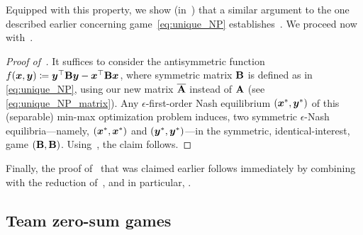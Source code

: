 Equipped with this property, we show (in~) that a similar argument to the one described earlier concerning game~\eqref{eq:unique_NP} establishes~. We proceed now with~.
\begin{proof}[Proof of~]
It suffices to consider the antisymmetric function $f({\bm{x}},{\bm{y}}) \coloneqq {\bm{y}}^{\top} \mathbf{B}{\bm{y}} - {\bm{x}}^{\top} \mathbf{B}{\bm{x}}$, where symmetric matrix $\mathbf{B}$ is defined as in \eqref{eq:unique_NP}, using our new matrix $\overline{\mathbf{A}}$ instead of $\mathbf{A}$ (see \eqref{eq:unique_NP_matrix}). Any $\epsilon$-first-order Nash equilibrium $({\bm{x}}^*, {\bm{y}}^*)$ of this (separable) min-max optimization problem induces, two symmetric $\epsilon$-Nash equilibria---namely, $({\bm{x}}^*, {\bm{x}}^*)$ and $({\bm{y}}^*, {\bm{y}}^*)$---in the symmetric, identical-interest, game $(\mathbf{B}, \mathbf{B})$. Using~, the claim follows.
\end{proof}

Finally, the proof of~ that was claimed earlier follows immediately by combining~ with the reduction of~, and in particular, .

\iffalse

\begin{corollary}\label{cor:either} Given antisymmetric, continuous, $L$-smooth functions $f,g$, the problem of finding either an approximate symmetric fixed point of GDA for $f$ or an approximate non-symmetric fixed point of GDA for $g$ is \PPAD-complete.
\end{corollary}
\begin{proof} We consider the problem $\mathcal{A}$ to be $\symgdaFixed$ and $\mathcal{B}$ $\nsymgdaFixed.$ Using the same reasoning as by~\citet{Daskalakis11:Continuous}, we conclude that the problem $\textrm{EITHER}(\mathcal{A},\mathcal{B})$ is $(\PPAD \cap \NPP)$-complete, thus \PPAD-complete.
\end{proof}
\begin{remark} If one can show Corollary \ref{cor:either} for a single function, this would imply \PPAD-completeness of finding fixed points of GDA for Cartesian product domains.
\end{remark}
\fi

\subsection{Team zero-sum games}
\label{sec:teamzero}

